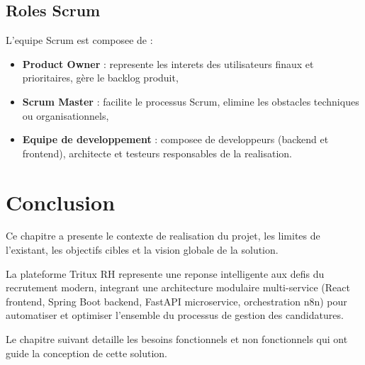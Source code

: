 \subsection{Roles Scrum}

L'equipe Scrum est composee de :

\begin{itemize}
    \item \textbf{Product Owner} : represente les interets des utilisateurs finaux et prioritaires, gère le backlog produit,
    
    \item \textbf{Scrum Master} : facilite le processus Scrum, elimine les obstacles techniques ou organisationnels,
    
    \item \textbf{Equipe de developpement} : composee de developpeurs (backend et frontend), architecte et testeurs responsables de la realisation.
\end{itemize}

\section{Conclusion}

Ce chapitre a presente le contexte de realisation du projet, les limites de l'existant, les objectifs cibles et la vision globale de la solution. 

La plateforme Tritux RH represente une reponse intelligente aux defis du recrutement modern, integrant une architecture modulaire multi-service (React frontend, Spring Boot backend, FastAPI microservice, orchestration n8n) pour automatiser et optimiser l'ensemble du processus de gestion des candidatures.

Le chapitre suivant detaille les besoins fonctionnels et non fonctionnels qui ont guide la conception de cette solution.